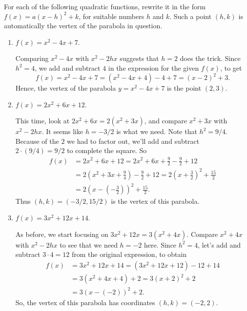 \documentclass{ximera}
\begin{document}
\begin{example}
  For each of the following quadratic functions, rewrite it in the form $f(x) = a(x-h)^2+k$, for suitable numbers $h$ and $k$. Such a point $(h,k)$ is automatically the vertex of the parabola in question.
  \begin{enumerate}[label=\alph*.]
  \item $f(x) = x^2-4x+7$. \\[.5em]
    \begin{explanation}
      Comparing $x^2-4x$ with $x^2-2hx$ suggests that $h=2$ does the trick. Since $h^2=4$, we add and subtract $4$ in the expression for the given $f(x)$, to get $$  f(x) = x^2-4x+7 =(x^2-4x+4)-4+7 = (x-2)^2+3.   $$Hence, the vertex of the parabola $y=x^2-4x+7$ is the point $(2,3)$.
    \end{explanation}
  \item $f(x) = 2x^2 + 6x+12$. \\[.5em]
    \begin{explanation}
      This time, look at $2x^2+6x = 2(x^2+3x)$, and compare $x^2+3x$ with $x^2-2hx$. It seems like $h=-3/2$ is what we need. Note that $h^2 = 9/4$. Because of the $2$ we had to factor out, we'll add and subtract $2 \cdot (9/4) = 9/2$ to complete the square. So \begin{align*}f(x) &= 2x^2+6x+12 = 2x^2+6x + \frac{9}{2} - \frac{9}{2} + 12 \\ &= 2\left(x^2+3x+\frac{9}{4}\right) -\frac{9}{2} + 12 = 2\left(x+\frac{3}{2}\right)^2 + \frac{15}{2}\\ &=  2\left(x-\left(-\frac{3}{2}\right)\right)^2 + \frac{15}{2}.\end{align*}Thus $(h,k) = (-3/2, 15/2)$ is the vertex of this parabola.
    \end{explanation}
  \item $f(x) = 3x^2 + 12x + 14$. \\[.5em]
    \begin{explanation}
      As before, we start focusing on $3x^2+12x = 3(x^2+4x)$. Compare $x^2+4x$ with $x^2-2hx$ to see that we need $h = -2$ here. Since $h^2 = 4$, let's add and subtract $3 \cdot 4 = 12$ from the original expression, to obtain
      \begin{align*}
        f(x) &= 3x^2+12x+14 = (3x^2+12x+12)-12+14 \\ &= 3(x^2+4x+4) + 2 = 3(x+2)^2+2 \\ &= 3(x-(-2))^2+2.
      \end{align*}
So, the vertex of this parabola has coordinates $(h,k) = (-2,2)$.
    \end{explanation}
  \end{enumerate}
\end{example}
\end{document}
